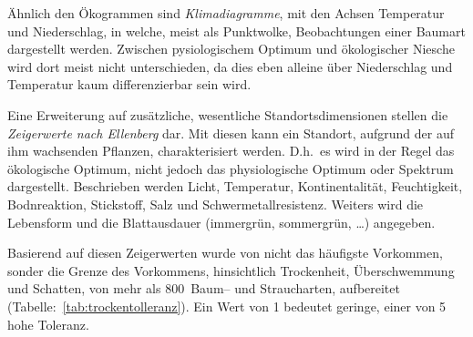 \documentclass[twocolumn]{scrartcl}
\begin{document}
Ähnlich den Ökogrammen sind \emph{Klimadiagramme}, mit den Achsen
Temperatur und Niederschlag, in welche, meist als Punktwolke,
Beobachtungen einer Baumart dargestellt werden. Zwischen
pysiologischem Optimum und ökologischer Niesche wird dort meist nicht
unterschieden, da dies eben alleine über Niederschlag und Temperatur
kaum differenzierbar sein wird.

Eine Erweiterung auf zusätzliche, wesentliche Standortsdimensionen
stellen die \emph{Zeigerwerte nach Ellenberg} dar. Mit diesen kann ein
Standort, aufgrund der auf ihm wachsenden Pflanzen, charakterisiert
werden. D.h.\ es wird in der Regel das ökologische Optimum, nicht
jedoch das physiologische Optimum oder Spektrum
dargestellt. Beschrieben werden Licht, Temperatur, Kontinentalität,
Feuchtigkeit, Bodnreaktion, Stickstoff, Salz und
Schwermetallresistenz. Weiters wird die Lebensform und die
Blattausdauer (immergrün, sommergrün, \dots) angegeben.

Basierend auf diesen Zeigerwerten wurde von
\cite{ninemetsValladares2006TolleranceToShadeDroughtAndWaterlogging}
nicht das häufigste Vorkommen, sonder die Grenze des Vorkommens,
hinsichtlich Trockenheit, Überschwemmung und Schatten, von mehr als
800~Baum-- und Straucharten, aufbereitet
(Tabelle:~\ref{tab:trockentolleranz}). Ein Wert von 1 bedeutet
geringe, einer von 5 hohe Toleranz.
\end{document}
